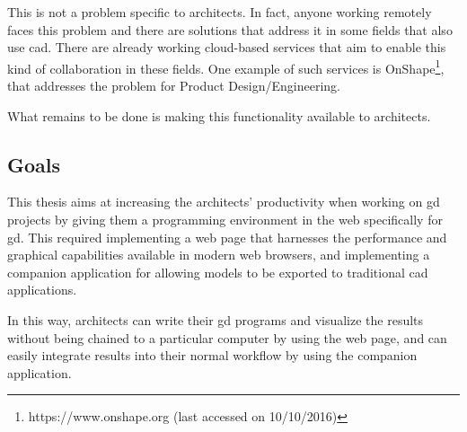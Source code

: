 This is not a problem specific to architects.
In fact, anyone working remotely faces this problem and there are solutions that address it in some fields that also use \gls{cad}.
There are already working cloud-based services that aim to enable this kind of collaboration in these fields.
One example of such services is OnShape\footnote{https://www.onshape.org (last accessed on 10/10/2016)}, that addresses the problem for Product Design/Engineering.

What remains to be done is making this functionality available to architects.


\subsection{Goals}
This thesis aims at increasing the architects' productivity when working on \gls{gd} projects by giving them a programming environment in the web specifically for \gls{gd}.
This required implementing a web page that harnesses the performance and graphical capabilities available in modern web browsers, and implementing a companion application for allowing models to be exported to traditional \gls{cad} applications.

In this way, architects can write their \gls{gd} programs and visualize the results without being chained to a particular computer by using the web page, and can easily integrate results into their normal workflow by using the companion application.


